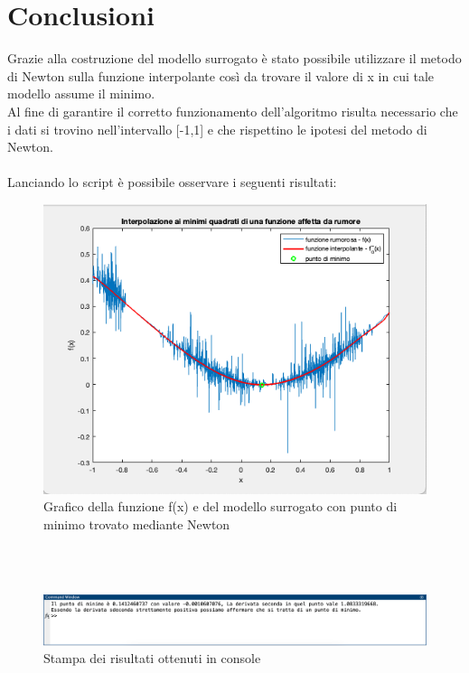 \documentclass{article}
\begin{document}
\section{Conclusioni}
Grazie alla costruzione del modello surrogato è stato possibile utilizzare il metodo di Newton sulla funzione interpolante così da trovare il valore di x in cui tale modello assume il minimo.\\
Al fine di garantire il corretto funzionamento dell'algoritmo risulta necessario che i dati si trovino nell'intervallo [-1,1] e che rispettino le ipotesi del metodo di Newton.\\\\
Lanciando lo script è possibile osservare i seguenti risultati:
\begin{figure}[!h]
    \centering
    \label{fig:result}
    \includegraphics[width=1\textwidth]{images/risultato_figura.png}
    \caption{Grafico della funzione f(x) e del modello surrogato con punto di minimo trovato mediante Newton}
\end{figure}
\textbf{}\\\\
\begin{figure}[!h]
    \centering
    \label{fig:consoleResult}
    \includegraphics[width=1\textwidth]{images/risultato_console.png}
    \caption{Stampa dei risultati ottenuti in console}
\end{figure}
\end{document}
